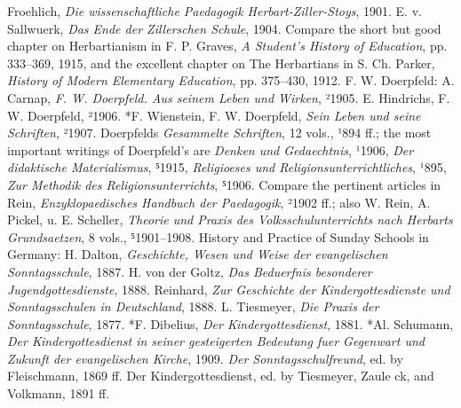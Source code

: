 Froehlich, \emph{Die wissenschaftliche Paedagogik Herbart-Ziller-Stoys}, 1901. E. v. Sallwuerk, \emph{Das Ende der Zillerschen Schule}, 1904. Compare the short but good chapter on Herbartianism in F. P. Graves, \emph{A Student’s History of Education}, pp. 333–369, 1915, and the excellent chapter on The Herbartians in S. Ch. Parker, \emph{History of Modern Elementary Education}, pp. 375–430, 1912. F. W. Doerpfeld: A. Carnap, \emph{F. W. Doerpfeld. Aus seinem Leben und Wirken}, ²1905. E. Hindrichs, F. W. Doerpfeld, ²1906. *F. Wienstein, F. W. Doerpfeld, \emph{Sein Leben und seine Schriften}, ²1907. Doerpfelds \emph{Gesammelte Schriften}, 12 vols., ¹894 ff.; the most important writings of Doerpfeld’s are \emph{Denken und Gedaechtnis}, ¹1906, \emph{Der didaktische Materialismus}, ⁵1915, \emph{Religioeses und Religionsunterrichtliches}, ¹895, \emph{Zur Methodik des Religionsunterrichts}, ⁵1906. Compare the pertinent articles in Rein, \emph{Enzyklopaedisches Handbuch der Paedagogik}, ²1902 ff.; also W. Rein, A. Pickel, u. E. Scheller, \emph{Theorie und Praxis des Volksschulunterrichts nach Herbarts Grundsaetzen}, 8 vols., ⁵1901–1908. History and Practice of Sunday Schools in Germany: H. Dalton, \emph{Geschichte, Wesen und Weise der evangelischen Sonntagsschule}, 1887. H. von der Goltz, \emph{Das Beduerfnis besonderer Jugendgottesdienste}, 1888. Reinhard, \emph{Zur Geschichte der Kindergottesdienste und Sonntagsschulen in Deutschland}, 1888. L. Tiesmeyer, \emph{Die Praxis der Sonntagsschule}, 1877. *F. Dibelius, \emph{Der Kindergottesdienst}, 1881. *Al. Schumann, \emph{Der Kindergottesdienst in seiner gesteigerten Bedeutung fuer Gegenwart und Zukunft der evangelischen Kirche}, 1909. \emph{Der Sonntagsschulfreund}, ed. by Fleischmann, 1869 ff. Der Kindergottesdienst, ed. by Tiesmeyer, Zaule ck, and Volkmann, 1891 ff.

